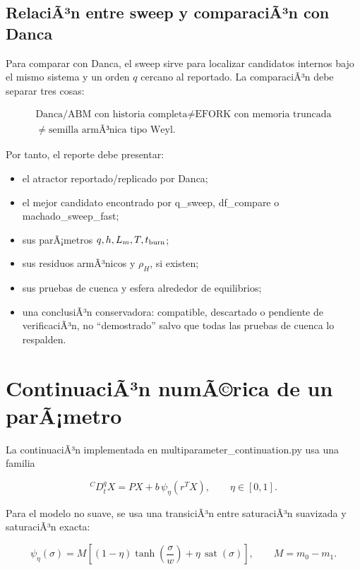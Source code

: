 \documentclass[11pt]{article}
\DeclareRobustCommand{\codepath}[1]{\begingroup\Urlmuskip=0mu plus 2mu\path{#1}\endgroup}
\def\codepath#1{#1}%
\begin{document}
\subsection{RelaciÃ³n entre sweep y comparaciÃ³n con Danca}

Para comparar con Danca, el sweep sirve para localizar candidatos internos bajo el mismo sistema y un orden \(q\) cercano al reportado. La comparaciÃ³n debe separar tres cosas:

\begin{equation}
\begin{gathered}
\text{Danca/ABM con historia completa}\neq
\text{EFORK con memoria truncada}\\
\neq\text{semilla armÃ³nica tipo Weyl}.
\end{gathered}
\end{equation}

Por tanto, el reporte debe presentar:
\begin{itemize}
\item el atractor reportado/replicado por Danca;
\item el mejor candidato encontrado por \codepath{q_sweep}, \codepath{df_compare} o \codepath{machado_sweep_fast};
\item sus parÃ¡metros \(q,h,L_m,T,t_{\rm burn}\);
\item sus residuos armÃ³nicos y \(\rho_H\), si existen;
\item sus pruebas de cuenca y esfera alrededor de equilibrios;
\item una conclusiÃ³n conservadora: compatible, descartado o pendiente de verificaciÃ³n, no ``demostrado'' salvo que todas las pruebas de cuenca lo respalden.
\end{itemize}


\section{ContinuaciÃ³n numÃ©rica de un parÃ¡metro}

La continuaciÃ³n implementada en \codepath{multiparameter_continuation.py} usa una familia

\begin{equation}
{}^C D_t^q X=P X+b\,\psi_{\eta}(r^TX),
\qquad \eta\in[0,1].
\end{equation}

Para el modelo no suave, se usa una transiciÃ³n entre saturaciÃ³n suavizada y saturaciÃ³n exacta:

\begin{equation}
\psi_{\eta}(\sigma)
=
M\left[(1-\eta)\tanh\left(\frac{\sigma}{w}\right)
+
\eta\,\operatorname{sat}(\sigma)\right],
\qquad M=m_0-m_1.
\end{equation}
\end{document}
